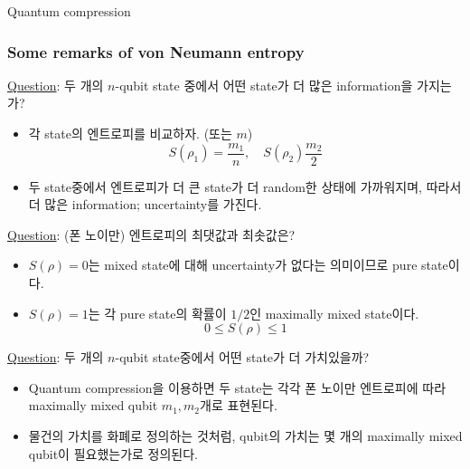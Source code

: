 \documentclass[9pt]{beamer}
\begin{document}
\begin{section}{Quantum compression}
        \begin{frame}
            \frametitle{Some remarks of von Neumann entropy}
            \underline{Question}: 두 개의 $n$-qubit state 중에서 어떤 state가 더 많은 information을 가지는가?
            \begin{itemize}
                \item 각 state의 엔트로피를 비교하자. (또는 $m$)
                \begin{equation*}
                    S(\rho_1) =\frac{m_1}{n},\quad  S(\rho_2) \frac{m_2}{2}
                \end{equation*}
                \item 두 state중에서 엔트로피가 더 큰 state가 더 random한 상태에 가까워지며, 따라서 더 많은 information; uncertainty를 가진다.
            \end{itemize}
            \vspace{0.4cm}
            \underline{Question}: (폰 노이만) 엔트로피의 최댓값과 최솟값은?
            \begin{itemize}
                \item $S(\rho) = 0$는 mixed state에 대해 uncertainty가 없다는 의미이므로 \alert{pure state}이다.
                \item $S(\rho) = 1$는 각 pure state의 확률이 $1/2$인 \alert{maximally mixed state}이다.
                \begin{equation*}
                    0 \le S(\rho) \le 1
                \end{equation*}
            \end{itemize}
            \vspace{0.4cm}
            \underline{Question}: 두 개의 $n$-qubit state중에서 어떤 state가 더 가치있을까?
            \begin{itemize}
                \item Quantum compression을 이용하면 두 state는 각각 폰 노이만 엔트로피에 따라 \alert{maximally mixed qubit} $m_1, m_2$개로 표현된다.
                \item 물건의 가치를 화폐로 정의하는 것처럼, qubit의 가치는 몇 개의 maximally mixed qubit이 필요했는가로 정의된다.
            \end{itemize}
        \end{frame}
    \end{section}
\end{document}
